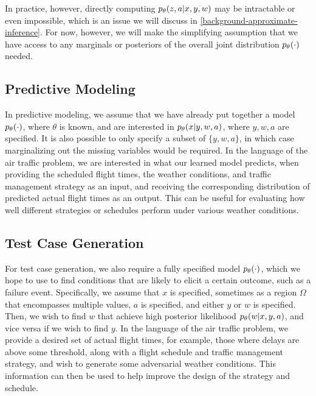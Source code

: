 In practice, however, directly computing $\pld{z,a\given x,y,w}$ may be intractable or even impossible, which is an issue we will discuss in \cref{background-approximate-inference}. For now, however, we will make the simplifying assumption that we have access to any marginals or posteriors of the overall joint distribution $\pld{\cdot}$ needed.

\subsection{Predictive Modeling}
\label{subsec:intro-variants-predictive}

In predictive modeling, we assume that we have already put together a model $\pld{\cdot}$, where $\theta$ is known, and are interested in $\pld{x\given y, w, a}$, where $y,w,a$ are specified. It is also possible to only specify a subset of $\{y,w,a\}$, in which case marginalizing out the missing variables would be required. In the language of the air traffic problem, we are interested in what our learned model predicts, when providing the scheduled flight times, the weather conditions, and traffic management strategy as an input, and receiving the corresponding distribution of predicted actual flight times as an output. This can be useful for evaluating how well different strategies or schedules perform under various weather conditions.

\subsection{Test Case Generation}
\label{subsec:intro-variants-generation}

For test case generation, we also require a fully specified model $\pld{\cdot}$, which we hope to use to find conditions that are likely to elicit a certain outcome, such as a failure event. Specifically, we assume that $x$ is specified, sometimes as a region $\Omega$ that encompasses multiple values, $a$ is specified, and either $y$ or $w$ is specified. Then, we wish to find $w$ that achieve high posterior likelihood $\pld{w\given x,y,a}$, and vice versa if we wish to find $y$. In the language of the air traffic problem, we provide a desired set of actual flight times, for example, those where delays are above some threshold, along with a flight schedule and traffic management strategy, and wish to generate some adversarial weather conditions. This information can then be used to help improve the design of the strategy and schedule.

